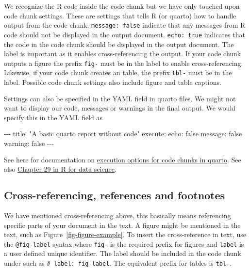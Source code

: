 \documentclass[
  11pt,
  letterpaper,
]{scrbook}
\newenvironment{Shaded}{\begin{snugshade}}{\end{snugshade}}
\newcommand{\NormalTok}[1]{\textcolor[rgb]{0.00,0.23,0.31}{#1}}
\newcommand{\SpecialCharTok}[1]{\textcolor[rgb]{0.37,0.37,0.37}{#1}}
\newcommand{\StringTok}[1]{\textcolor[rgb]{0.13,0.47,0.30}{#1}}
\begin{document}
We recognize the R code inside the code chunk but we have only touched
upon code chunk settings. These are settings that tells R (or quarto)
how to handle output from the code chunk. \texttt{message:\ false}
indicate that any messages from R code should not be displayed in the
output document. \texttt{echo:\ true} indicates that the code in the
code chunk should be displayed in the output document. The label is
important as it enables cross-referencing the output. If your code chunk
outputs a figure the prefix \texttt{fig-} must be in the label to enable
cross-referencing. Likewise, if your code chunk creates an table, the
prefix \texttt{tbl-} must be in the label. Possible code chunk settings
also include figure and table captions.

Settings can also be specified in the YAML field in quarto files. We
might not want to display our code, messages or warnings in the final
output. We would specify this in the YAML field as

\begin{Shaded}
\begin{Highlighting}[numbers=left,,]
\SpecialCharTok{{-}{-}{-}}
\NormalTok{title}\SpecialCharTok{:} \StringTok{"A basic quarto report without code"}
\NormalTok{execute}\SpecialCharTok{:}
\NormalTok{  echo}\SpecialCharTok{:}\NormalTok{ false}
\NormalTok{  message}\SpecialCharTok{:}\NormalTok{ false}
\NormalTok{  warning}\SpecialCharTok{:}\NormalTok{ false}
\SpecialCharTok{{-}{-}{-}}
\end{Highlighting}
\end{Shaded}

See here for documentation on
\href{https://quarto.org/docs/computations/execution-options.html\#output-options}{execution
options for code chunks in quarto}. See also
\href{https://r4ds.hadley.nz/quarto.html}{Chapter 29 in R for data
science}.

\hypertarget{sec-cross-reference}{%
\subsection{Cross-referencing, references and
footnotes}\label{sec-cross-reference}}

We have mentioned cross-referencing above, this basically means
referencing specific parts of your document in the text. A figure might
be mentioned in the text, such as Figure~\ref{fig-figure-example}. To
insert the cross-reference in text, use the \texttt{@fig-label} syntax
where \texttt{fig-} is the required prefix for figures and
\texttt{label} is a user defined unique identifier. The label should be
included in the code chunk under such as
\texttt{\#\textbar{}\ label:\ fig-label}. The equivalent prefix for
tables is \texttt{tbl-}.
\end{document}
